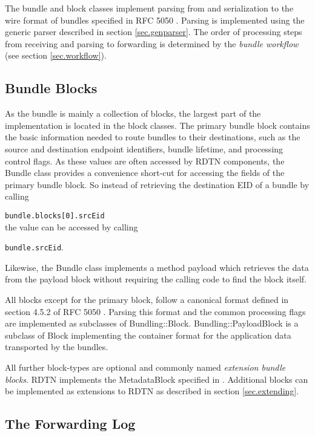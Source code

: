 \documentclass{article}
\begin{document}
The bundle and block classes implement parsing from and serialization to the
wire format of bundles specified in RFC 5050 \cite{bundle-spec}. Parsing is
implemented using the generic parser described in section \ref{sec.genparser}.
The order of processing steps from receiving and parsing to forwarding is
determined by the {\em bundle workflow} (see section \ref{sec.workflow}).

\subsection{Bundle Blocks}\label{sec.bundle-blocks}

As the bundle is mainly a collection of blocks, the largest part of the
implementation is located in the block classes. The primary bundle block
contains the basic information needed to route bundles to their destinations,
such as the source and destination endpoint identifiers, bundle lifetime, and
processing control flags. As these values are often accessed by RDTN components,
the Bundle class provides a convenience short-cut for accessing the fields of
the primary bundle block. So instead of retrieving the destination EID of a
bundle by calling

{\tt bundle.blocks[0].srcEid}\\
the value can be accessed by calling

{\tt bundle.srcEid}.

Likewise, the Bundle class implements a method payload which retrieves the data
from the payload block without requiring the calling code to find the block
itself.

All blocks except for the primary block, follow a canonical format defined in
section 4.5.2 of RFC 5050 \cite{bundle-spec}. Parsing this format and the common
processing flags are implemented as subclasses of Bundling::Block.
Bundling::PayloadBlock is a subclass of Block implementing the container format
for the application data transported by the bundles.

All further block-types are optional and commonly named {\em extension bundle
blocks}. RDTN implements the MetadataBlock specified in \cite{metadata-block}.
Additional blocks can be implemented as extensions to RDTN as described in
section \ref{sec.extending}.

\subsection{The Forwarding Log}\label{sec.forward-log}
\end{document}
